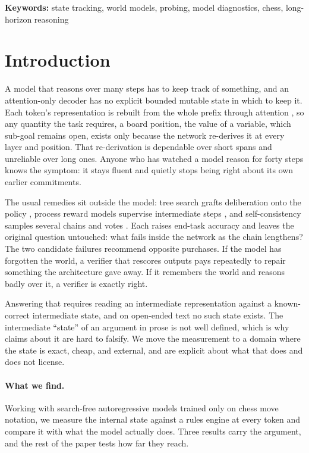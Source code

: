 \documentclass[manuscript, screen, review]{jair}
\theoremstyle{remark}
\begin{document}
\maketitle



\noindent\textbf{Keywords:} state tracking, world models, probing, model
diagnostics, chess, long-horizon reasoning

\section{Introduction}

A model that reasons over many steps has to keep track of something, and an
attention-only decoder has no explicit bounded mutable state in which to keep it.
Each token's representation is rebuilt from the whole prefix through attention
\citep{vaswani2017attention}, so any quantity the task requires, a board
position, the value of a variable, which sub-goal remains open, exists only
because the network re-derives it at every layer and position. That re-derivation
is dependable over short spans and unreliable over long ones. Anyone who has
watched a model reason for forty steps knows the symptom: it stays fluent and
quietly stops being right about its own earlier commitments.

The usual remedies sit outside the model: tree search grafts deliberation onto
the policy \citep{yao2023tree}, process reward models supervise intermediate
steps \citep{lightman2024lets}, and self-consistency samples several chains and
votes \citep{wang2023selfconsistency}. Each raises end-task accuracy and leaves
the original question untouched: what fails inside the network as the chain
lengthens? The two candidate failures recommend opposite purchases. If the model
has forgotten the world, a verifier that rescores outputs pays repeatedly to
repair something the architecture gave away. If it remembers the world and
reasons badly over it, a verifier is exactly right.

Answering that requires reading an intermediate representation against a
known-correct intermediate state, and on open-ended text no such state exists.
The intermediate ``state'' of an argument in prose is not well defined, which is
why claims about it are hard to falsify. We move the measurement to a domain
where the state is exact, cheap, and external, and are explicit about what that
does and does not license.

\paragraph{What we find.}
Working with search-free autoregressive models trained only on chess move
notation, we measure the internal state against a rules engine at every token and
compare it with what the model actually does. Three results carry the argument, and the rest of
the paper tests how far they reach.
\end{document}
